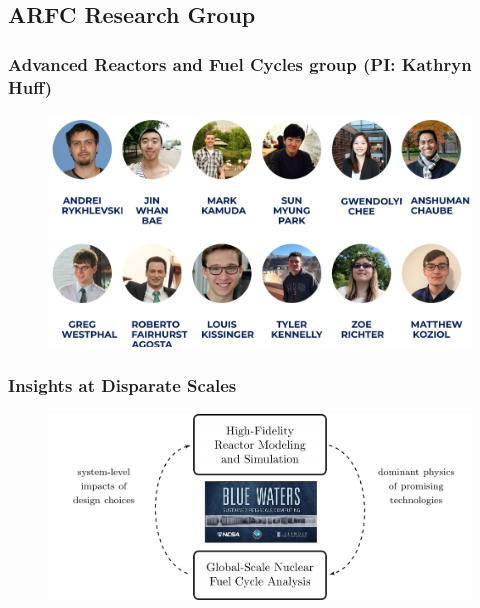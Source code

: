 \subsection{ARFC Research Group}
\begin{frame}
  \frametitle{Advanced Reactors and Fuel Cycles group (PI: Kathryn Huff)}
               \begin{figure}[t]
                \vspace*{-0.1in}
                \includegraphics[width=\textwidth]{./images/arfc1.png}
               \end{figure}            
\end{frame}

\begin{frame}
  \frametitle{Insights at Disparate Scales}
               \begin{figure}[t]
                \vspace*{-0.1in}
			\hspace*{-0.35in}
                \includegraphics[height=0.5\textwidth]{./images/synergy.png}
               \end{figure}            
\end{frame}


